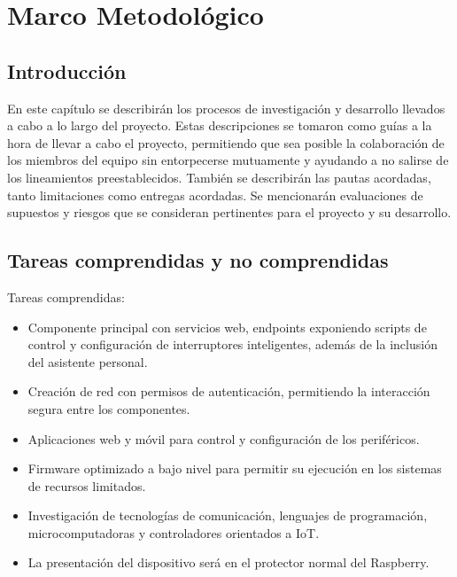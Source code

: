 \chapter{Marco Metodológico}

\section{Introducción}
En este capítulo se describirán los procesos de investigación y desarrollo llevados a cabo a lo largo del proyecto. Estas descripciones se tomaron como guías a la hora de llevar a cabo el proyecto, permitiendo que sea posible la colaboración de los miembros del equipo sin entorpecerse mutuamente y ayudando a no salirse de los lineamientos preestablecidos.
También se describirán las pautas acordadas, tanto limitaciones como entregas acordadas. Se mencionarán evaluaciones de supuestos y riesgos que se consideran pertinentes para el proyecto y su desarrollo.

\section{Tareas comprendidas y no comprendidas}
Tareas comprendidas:

\begin{itemize}

\item Componente principal con servicios web, endpoints exponiendo scripts de control y
configuración de interruptores inteligentes, además de la inclusión del asistente personal.

\item Creación de red con permisos de autenticación, permitiendo la interacción segura entre los componentes.

\item Aplicaciones web y móvil para control y configuración de los periféricos.

\item Firmware optimizado a bajo nivel para permitir su ejecución en los sistemas de recursos limitados.

\item Investigación de tecnologías de comunicación, lenguajes de programación,
microcomputadoras y controladores orientados a IoT.

\item La presentación del dispositivo será en el protector normal del Raspberry.

\end{itemize}

